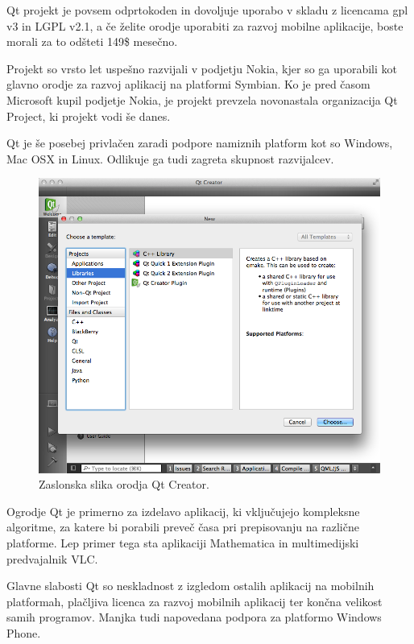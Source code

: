 Qt projekt je povsem odprtokoden in dovoljuje uporabo v skladu z licencama \gls{gpl} v3\cite{gpl} in LGPL v2.1\cite{lgpl}, a če želite orodje uporabiti za razvoj mobilne aplikacije, boste morali za to odšteti 149\$ mesečno.

Projekt so vrsto let uspešno razvijali v podjetju Nokia, kjer so ga uporabili kot glavno orodje za razvoj aplikacij na platformi Symbian. Ko je pred časom Microsoft kupil podjetje Nokia, je projekt prevzela novonastala organizacija Qt Project, ki projekt vodi še danes.

Qt je še posebej privlačen zaradi podpore namiznih platform kot so Windows, Mac OSX in Linux. Odlikuje ga tudi zagreta skupnost razvijalcev.

\begin{figure}
 \includegraphics[width=\linewidth]{qt-creator}
 \caption{Zaslonska slika orodja Qt Creator.}
 \label{fig:qt-creator}
\end{figure}

Ogrodje Qt je primerno za izdelavo aplikacij, ki vključujejo kompleksne algoritme, za katere bi porabili preveč časa pri prepisovanju na različne platforme. Lep primer tega sta aplikaciji Mathematica\cite{mathematica} in multimedijski predvajalnik VLC\cite{vlc}.

Glavne slabosti Qt so neskladnost z izgledom ostalih aplikacij na mobilnih platformah, plačljiva licenca za razvoj mobilnih aplikacij ter končna velikost samih programov. Manjka tudi napovedana podpora za platformo Windows Phone.

